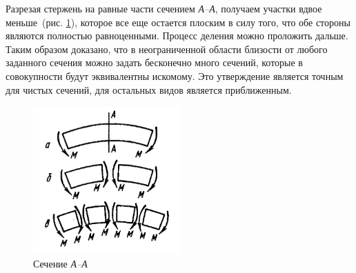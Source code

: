\documentclass[12pt, a4paper]{article}
\begin{document}
Разрезая стержень на равные части сечением \emph{А--А}, получаем участки вдвое меньше~(рис. \ref{pic2}), которое все еще остается плоским в силу того, что обе стороны являются полностью равноценными. Процесс деления можно проложить дальше. Таким образом доказано, что в неограниченной области близости от любого заданного сечения можно задать бесконечно много сечений, которые в совокупности будут эквивалентны искомому. Это утверждение является точным для чистых сечений, для остальных видов является приближенным.
\begin{figure}[!h]
	\centering
	\includegraphics[width=0.5\textwidth]{pic.2}%
	\caption{Сечение \emph{А--А}}
	\vspace*{-2mm}
	\label{pic2}
\end{figure}
\end{document}
